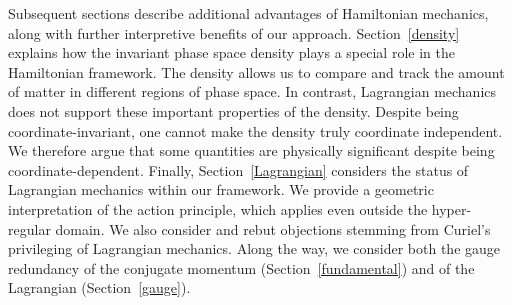 \documentclass[letterpaper]{article}
\begin{document}
Subsequent sections describe additional advantages of Hamiltonian mechanics, along with further interpretive benefits of our approach. Section~\ref{density} explains how the invariant phase space density plays a special role in the Hamiltonian framework. The density allows us to compare and track the amount of matter in different regions of phase space. In contrast, Lagrangian mechanics does not support these important properties of the density. Despite being coordinate-invariant, one cannot make the density truly coordinate independent. We therefore argue that some quantities are physically significant despite being coordinate-dependent. Finally, Section~\ref{Lagrangian} considers the status of Lagrangian mechanics within our framework. We provide a geometric interpretation of the action principle, which applies even outside the hyper-regular domain. We also consider and rebut objections stemming from Curiel's \parencites*[]{Curiel} privileging of Lagrangian mechanics. Along the way, we consider both the gauge redundancy of the conjugate momentum (Section~\ref{fundamental}) and of the Lagrangian (Section~\ref{gauge}).



\end{document}
